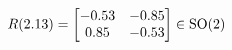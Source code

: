 \documentclass[preview]{standalone}
\begin{document}
\begin{align*}
\special{dvisvgm:raw <g id='unique000'>}R(2.13) = \begin{bmatrix} -0.53 & -0.85 \\ 0.85 & -0.53 \end{bmatrix} \in \text{SO}(2)\special{dvisvgm:raw </g>}
\end{align*}
\end{document}
